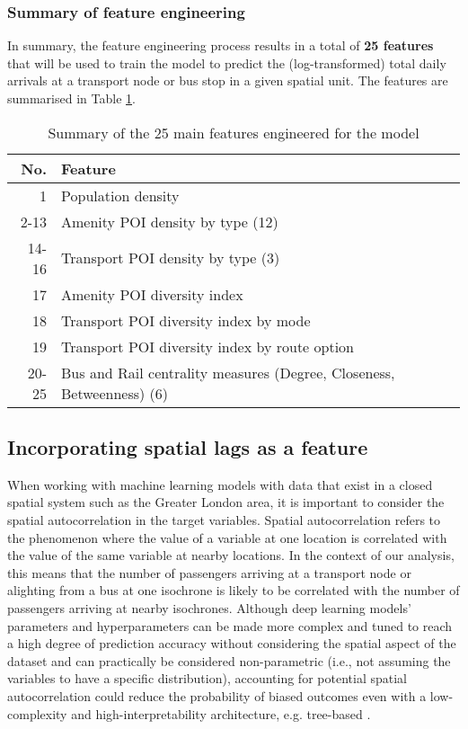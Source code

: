 \subsubsection*{Summary of feature engineering}

In summary, the feature engineering process results in a total of \textbf{25 features} that will be used to train the model to predict the (log-transformed) total daily arrivals at a transport node or bus stop in a given spatial unit. The features are summarised in Table \ref{tab:features}.

\begin{table}[ht]
    \centering
    \renewcommand{\arraystretch}{1.5}
    \begin{tabular}{|r||l|}
        \hline
        \rowcolor{lightgray}
        \textbf{No.} & \textbf{Feature} \\
        \hline
        1 & Population density \\
        2-13 & Amenity POI density by type (12) \\
        14-16 & Transport POI density by type (3) \\
        17 & Amenity POI diversity index \\
        18 & Transport POI diversity index by mode \\
        19 & Transport POI diversity index by route option \\
        20-25 & Bus and Rail centrality measures (Degree, Closeness, Betweenness) (6) \\
        \hline
    \end{tabular}
    \caption{Summary of the 25 main features engineered for the model}
    \label{tab:features}
\end{table}
\subsection{Incorporating spatial lags as a feature}

When working with machine learning models with data that exist in a closed spatial system such as the Greater London area, it is important to consider the spatial autocorrelation in the target variables. Spatial autocorrelation refers to the phenomenon where the value of a variable at one location is correlated with the value of the same variable at nearby locations. In the context of our analysis, this means that the number of passengers arriving at a transport node or alighting from a bus at one isochrone is likely to be correlated with the number of passengers arriving at nearby isochrones. Although deep learning models' parameters and hyperparameters can be made more complex and tuned to reach a high degree of prediction accuracy without considering the spatial aspect of the dataset and can practically be considered non-parametric (i.e., not assuming the variables to have a specific distribution), accounting for potential spatial autocorrelation could reduce the probability of biased outcomes even with a low-complexity and high-interpretability architecture, e.g. tree-based \citep{meyerImportanceSpatialPredictor2019}.

